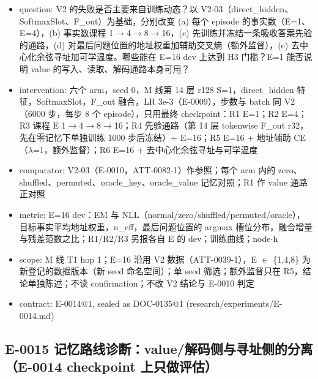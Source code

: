 \documentclass[11pt]{article}
\begin{document}
\begin{itemize}
\item question: V2 的失败是否主要来自训练动态？以 V2-03（direct\_hidden、SoftmaxSlot、F\_out）为基础，分别改变 (a) 每个 episode 的事实数（E=1、E=4），(b) 事实数课程 1\ensuremath{\rightarrow}4\ensuremath{\rightarrow}8\ensuremath{\rightarrow}16，(c) 先训练并冻结一条吸收答案先验的通路，(d) 对最后问题位置的地址权重加辅助交叉熵（额外监督），(e) 去中心化余弦寻址加可学温度。哪些能在 E=16 dev 上达到 H3 门槛？E=1 能否说明 value 的写入、读取、解码通路本身可用？
\item intervention: 六个 arm，seed 0，M 线第 14 层 r128 S=1，direct\_hidden 特征，SoftmaxSlot，F\_out 融合，LR 3e-3（E-0009），步数与 batch 同 V2（6000 步，每步 8 个 episode），只用最终 checkpoint：R1 E=1；R2 E=4；R3 课程 E 1\ensuremath{\rightarrow}4\ensuremath{\rightarrow}8\ensuremath{\rightarrow}16；R4 先验通路（第 14 层 tokenwise F\_out r32，先在零记忆下单独训练 1000 步后冻结）+ E=16；R5 E=16 + 地址辅助 CE（\ensuremath{\lambda}=1，额外监督）；R6 E=16 + 去中心化余弦寻址与可学温度
\item comparator: V2-03（E-0010，ATT-0082-1）作参照；每个 arm 内的 zero、shuffled、permuted、oracle\_key、oracle\_value 记忆对照；R1 作 value 通路正对照
\item metric: E=16 dev：EM 与 NLL（normal/zero/shuffled/permuted/oracle），目标事实平均地址权重，n\_eff，最后问题位置的 argmax 槽位分布，融合增量与残差范数之比；R1/R2/R3 另报各自 E 的 dev；训练曲线；node\ensuremath{\cdot}h
\item scope: M 线 T1 hop 1；E=16 沿用 V2 数据（ATT-0039-1），E \ensuremath{\in} \{1,4,8\} 为新登记的数据版本（新 seed 命名空间）；单 seed 筛选；额外监督只在 R5，结论单独陈述；不读 confirmation；不改 V2 结论与 E-0010 判定
\item contract: E-0014@1, sealed as DOC-0135@1 (research/experiments/E-0014.md)
\end{itemize}

\subsection*{E-0015 记忆路线诊断：value/解码侧与寻址侧的分离（E-0014 checkpoint 上只做评估）}
\end{document}
